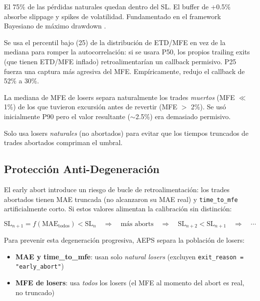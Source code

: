 \documentclass[11pt,a4paper]{article}
\newcommand{\code}[1]{\texttt{\small #1}}
\newcommand{\param}[1]{\texttt{\small\color{cpurple}#1}}
\begin{document}
\begin{description}[leftmargin=1.5em]
\item[\param{stop\_loss} --- $P_{75}$:]
  El 75\% de las p\'erdidas naturales quedan dentro del SL. El buffer
  de +0.5\% absorbe slippage y spikes de volatilidad. Fundamentado en
  el framework Bayesiano de m\'aximo drawdown \cite{bayesian_sl}.
\item[\param{trailing\_callback} --- $P_{25}$:]
  Se usa el percentil bajo (25) de la distribuci\'on de ETD/MFE en vez
  de la mediana para romper la autocorrelaci\'on: si se usara P50,
  los propios trailing exits (que tienen ETD/MFE inflado) retroalimentar\'ian
  un callback permisivo. P25 fuerza una captura m\'as agresiva del
  MFE. Emp\'iricamente, redujo el callback de 52\% a 30\%.
\item[\param{early\_abort\_max\_mfe} --- $P_{50}$:]
  La mediana de MFE de losers separa naturalmente los trades
  \textit{muertos} (MFE $\ll$ 1\%) de los que tuvieron excursi\'on
  antes de revertir (MFE $>$ 2\%). Se us\'o inicialmente P90 pero
  el valor resultante ($\sim$2.5\%) era demasiado permisivo.
\item[\param{early\_abort\_hours} --- $P_{75}$:]
  Solo usa losers \textit{naturales} (no abortados) para evitar
  que los tiempos truncados de trades abortados compriman el umbral.
\end{description}


\subsection{Protecci\'on Anti-Degeneraci\'on}
\label{sec:anti_degen}

El early abort introduce un riesgo de bucle de retroalimentaci\'on:
los trades abortados tienen MAE truncada (no alcanzaron su MAE real)
y \code{time\_to\_mfe} artificialmente corto. Si estos valores
alimentan la calibraci\'on sin distinci\'on:

\begin{equation}
\text{SL}_{n+1} = f(\text{MAE}_{\text{todos}}) < \text{SL}_n
\quad \Rightarrow \quad
\text{m\'as aborts} \quad \Rightarrow \quad
\text{SL}_{n+2} < \text{SL}_{n+1} \quad \Rightarrow \quad \cdots
\label{eq:feedback_loop}
\end{equation}

Para prevenir esta degeneraci\'on progresiva, AEPS separa la poblaci\'on
de losers:

\begin{itemize}[leftmargin=1.5em]
\item \textbf{MAE y time\_to\_mfe}: usan solo \textit{natural losers}
  (excluyen \code{exit\_reason = "early\_abort"})
\item \textbf{MFE de losers}: usa \textit{todos} los losers
  (el MFE al momento del abort es real, no truncado)
\end{itemize}
\end{document}
